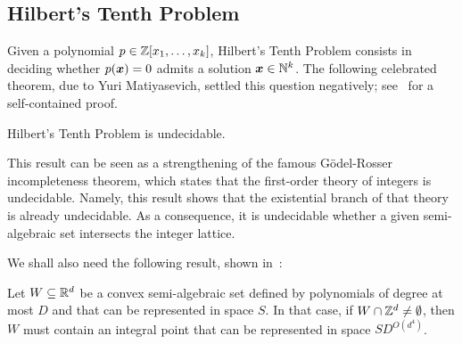 \subsection{Hilbert's Tenth Problem}
Given a polynomial $p \in \mathbb{Z}[x_{1}, \ldots, x_{k}]$, Hilbert's Tenth Problem consists in deciding whether $p(\boldsymbol{x}) = 0$ admits a solution $\boldsymbol{x} \in \mathbb{N}^{k}$. The following celebrated theorem, due to Yuri Matiyasevich, settled this question negatively; see~\cite{HTP} for a self-contained proof.
\begin{theorem}[Matiyasevich]
\label{thm:HTP}
Hilbert's Tenth Problem is undecidable.
\end{theorem}
This result can be seen as a strengthening of the famous G\"{o}del-Rosser incompleteness theorem, which states that the first-order theory of integers is undecidable. Namely, this result shows that the existential branch of that theory is already undecidable. As a consequence, it is undecidable whether a given semi-algebraic set intersects the integer lattice.

We shall also need the following result, shown in~\cite{KhachiyanP97}:
\begin{theorem}
\label{thm:kp}
Let $W\subseteq\mathbb{R}^{d}$ be a convex semi-algebraic set defined by
polynomials of degree at most $D$ and that can be represented in space
$S$. In that case, if $W\cap\mathbb{Z}^{d}\neq\emptyset$, then $W$ must
contain an integral point that can be represented in space
$SD^{O(d^4)}$.
\end{theorem}

